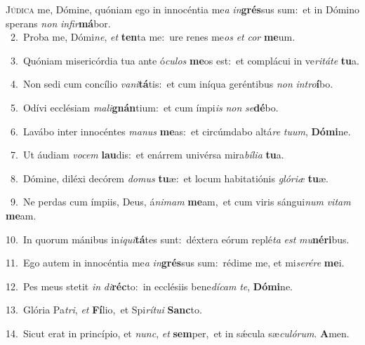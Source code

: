 \lettrine{\initial\textcolor{\initialcolor}{J}}{údica} me, Dómine, quóniam ego in innocéntia me\textit{a} \textit{in}\-\textbf{grés}sus sum:~\star et in Dómino sperans \textit{non} \textit{in}\-\textit{fir}\textbf{má}bor.\\
{\numbfont\textcolor{\numbcolor}{~2.}}~Proba me, Dómi\-\textit{ne}\-, \textit{et} \textbf{ten}\-ta me:~\star ure renes me\textit{os} \textit{et} \textit{cor} \textbf{me}\-um.\par
{\numbfont\textcolor{\numbcolor}{~3.}}~Quóniam misericórdia tua ante ó\-\textit{cu}\-\textit{los} \textbf{me}\-os est:~\star et complácui in ve\-\textit{ri}\-\textit{tá}\textit{te} \textbf{tu}\-a.\par
{\numbfont\textcolor{\numbcolor}{~4.}}~Non sedi cum concílio \textit{va}\-\textit{ni}\textbf{tá}tis:~\star et cum iníqua geréntibus \textit{non} \textit{in}\-\textit{tro}\textbf{í}bo.\par
{\numbfont\textcolor{\numbcolor}{~5.}}~Odívi ecclésiam \textit{ma}\-\textit{li}\textbf{gnán}tium:~\star et cum ímpi\textit{is} \textit{non} \textit{se}\-\textbf{dé}bo.\par
{\numbfont\textcolor{\numbcolor}{~6.}}~Lavábo inter innocéntes \textit{ma}\-\textit{nus} \textbf{me}\-as:~\star et circúmdabo altá\textit{re} \textit{tu}\-\textit{um}, \textbf{Dó}\-\textbf{mi}ne.\par
{\numbfont\textcolor{\numbcolor}{~7.}}~Ut áudiam \textit{vo}\-\textit{cem} \textbf{lau}\-dis:~\star et enárrem univérsa mira\-\textit{bí}\-\textit{li}\textit{a} \textbf{tu}\-a.\par
{\numbfont\textcolor{\numbcolor}{~8.}}~Dómine, diléxi decórem \textit{do}\-\textit{mus} \textbf{tu}\-æ:~\star et locum habitatiónis \textit{gló}\-\textit{ri}\textit{æ} \textbf{tu}\-æ.\par
{\numbfont\textcolor{\numbcolor}{~9.}}~Ne perdas cum ímpiis, Deus, á\-\textit{ni}\-\textit{mam} \textbf{me}\-am,~\star et cum viris sángui\textit{num} \textit{vi}\-\textit{tam} \textbf{me}\-am.\par
{\numbfont\textcolor{\numbcolor}{10.}}~In quorum mánibus in\-\textit{i}\-\textit{qui}\textbf{tá}tes sunt:~\star déxtera eórum replé\textit{ta} \textit{est} \textit{mu}\-\textbf{né}\textbf{ri}bus.\par
{\numbfont\textcolor{\numbcolor}{11.}}~Ego autem in innocéntia me\textit{a} \textit{in}\-\textbf{grés}sus sum:~\star rédime me, et mi\-\textit{se}\-\textit{ré}\textit{re} \textbf{me}\-i.\par
{\numbfont\textcolor{\numbcolor}{12.}}~Pes meus stetit \textit{in} \textit{di}\-\textbf{réc}to:~\star in ecclésiis bene\-\textit{dí}\-\textit{cam} \textit{te}\-, \textbf{Dó}\-\textbf{mi}ne.\par
{\numbfont\textcolor{\numbcolor}{13.}}~Glória Pa\-\textit{tri}\-, \textit{et} \textbf{Fí}\-lio,~\star et Spi\-\textit{rí}\-\textit{tu}\textit{i} \textbf{Sanc}\-to.\par
{\numbfont\textcolor{\numbcolor}{14.}}~Sicut erat in princípio, et \textit{nunc}\-, \textit{et} \textbf{sem}\-per,~\star et in sǽcula sæ\-\textit{cu}\-\textit{ló}\textit{rum}. \textbf{A}\-men.\par

